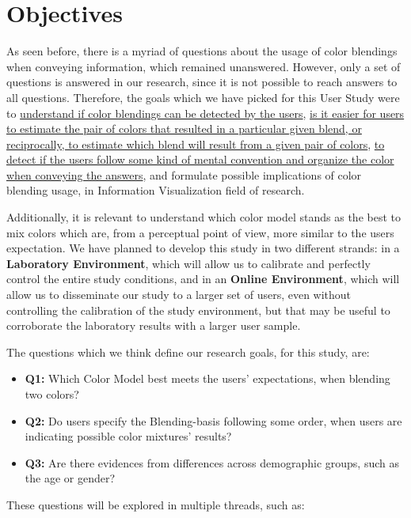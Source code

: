 \section{Objectives}
\label{sec:impl_objectives}
%
As seen before, there is a myriad of questions about the usage of color blendings when conveying information,
which remained unanswered. However, only a set of questions is answered in our research, since it is not possible
to reach answers to all questions. Therefore, the goals which we have picked for this User Study were to
\ul{understand if color blendings can be detected by the users}, \ul{is it easier for users to estimate the pair
of colors that resulted in a particular given blend, or reciprocally, to estimate which blend will result from a
given pair of colors}, \ul{to detect if the users follow some kind of mental convention and organize the color
when conveying the answers}, and formulate possible implications of color blending usage, in Information Visualization field of research. \par
%
Additionally, it is relevant to understand which color model stands as the best to mix colors which are, from a
perceptual point of view, more similar to the users expectation. We have planned to develop this study in two
different strands: in a \textbf{Laboratory Environment}, which will allow us to calibrate and perfectly control the
entire study conditions, and in an \textbf{Online Environment}, which will allow us to disseminate our study to a
larger set of users, even without controlling the calibration of the study environment, but that may be useful
to corroborate the laboratory results with a larger user sample. \par
%
The questions which we think define our research goals, for this study, are:
%
\begin{itemize}
	\setlength\itemsep{0.01em}
	\item \textbf{Q1:} Which Color Model best meets the users' expectations, when blending two colors?
	\item \textbf{Q2:} Do users specify the Blending-basis following some order, when users are indicating possible color
	mixtures' results?
	\item \textbf{Q3:} Are there evidences from differences across demographic groups, such as the age or gender?
\end{itemize}
%
These questions will be explored in multiple threads, such as:
%
